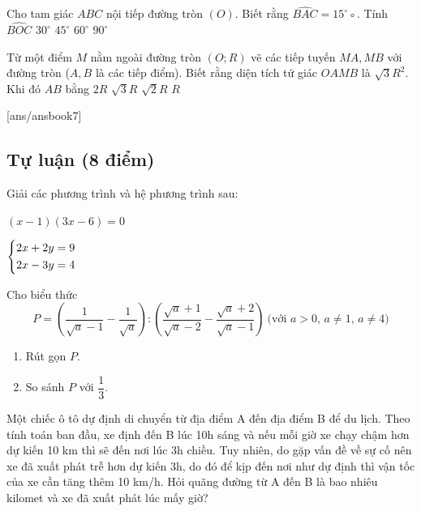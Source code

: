 \begin{ex}
Cho tam giác $ABC$ nội tiếp đường tròn $(O)$. Biết rằng $\widehat{BAC}=15^\circ$◦. Tính $\widehat{BOC}$
\choice
{\True $30^\circ$}
{$45^\circ$}
{$60^\circ$}
{$90^\circ$}
\end{ex}

\begin{ex}
Từ một điểm $M$ nằm ngoài đường tròn $(O;R)$ vẽ các tiếp tuyến $MA,MB$ với đường tròn ($A,B$ là các tiếp điểm). Biết rằng diện tích tứ giác $OAMB$ là $\sqrt{3}R^2$. Khi đó $AB$ bằng
\choice
{$2R$}
{\True $\sqrt{3}R$}
{$\sqrt{2}R$}
{$R$}
\end{ex}

[ans/ansbook7]
\setcounter{bt}{0}
\subsection{Tự luận (8 điểm)}
\begin{bt}[1,5 điểm]
Giải các phương trình và hệ phương trình sau:
\begin{listEX}[2]
\item $(x-1)(3x-6)=0$
\item $\left\{\begin{aligned}&2x+2y=9\\&2x-3y=4\end{aligned}\right.$
\end{listEX}
\end{bt}
\begin{bt}[1,5 điểm]
Cho biểu thức 
$$P=\left(\dfrac{1}{\sqrt{a}-1}-\dfrac{1}{\sqrt{a}}\right):\left(\dfrac{\sqrt{a}+1}{\sqrt{a}-2}-\dfrac{\sqrt{a}+2}{\sqrt{a}-1}\right)\ \text{(với } a>0,\, a\ne1,\, a\ne4)$$
\begin{enumerate}
\item Rút gọn $P$.
\item So sánh $P$ với $\dfrac{1}{3}$.
\end{enumerate}
\end{bt}
\begin{bt}[1,0 điểm]
 Một chiếc ô tô dự định di chuyển từ địa điểm A đến địa điểm B để du lịch. Theo tính toán ban đầu, xe định đến B lúc 10h sáng và nếu mỗi giờ xe chạy chậm hơn dự kiến 10 km thì sẽ đến nơi lúc 3h chiều. Tuy nhiên, do gặp vấn đề về sự cố nên xe đã xuất phát trễ hơn dự kiến 3h, do đó để kịp đến nơi như dự định thì vận tốc của xe cần tăng thêm 10 km/h. Hỏi quãng đường từ A đến B là bao nhiêu kilomet và xe đã xuất phát lúc mấy giờ?
\end{bt}
